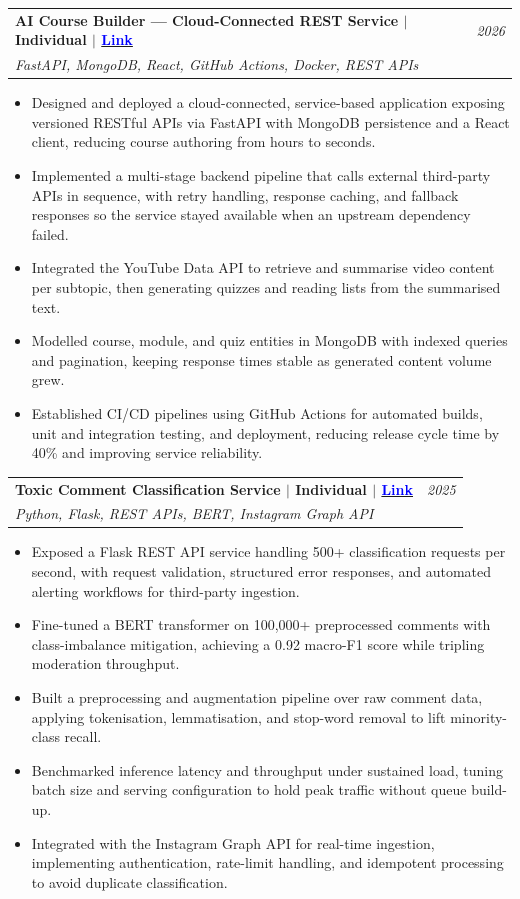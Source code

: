 \documentclass[a4paper,11pt]{article}
\makeatletter
\newcommand{\resumeProject}[4]{
\vspace{0.5mm}\item
    \begin{tabular*}{0.98\textwidth}[t]{l@{\extracolsep{\fill}}r}
        \textbf{#1} & \textit{\footnotesize{#3}} \\
        \footnotesize{\textit{#2}} & \footnotesize{#4}
    \end{tabular*}
    \vspace{-2.4mm}
}
\newcommand{\resumeItemListStart}{\begin{justify}\begin{itemize}[label=$\bullet$, leftmargin=3.4ex, rightmargin=1ex, noitemsep, labelsep=1.4mm, itemsep=0.35mm, topsep=0.6mm]\small}
\newcommand{\resumeItemListEnd}{\end{itemize}\end{justify}\vspace{-2mm}}
\makeatother
\begin{document}
  \resumeProject
    {AI Course Builder --- Cloud-Connected REST Service $\vert$ Individual $\vert$ \href{https://github.com/alexmorgan-dev/ai_course_builder.git}{\textcolor{blue}{Link}}}
    {FastAPI, MongoDB, React, GitHub Actions, Docker, REST APIs}
    {2026}
    {}
  \vspace{-1.0mm}
  \resumeItemListStart
    \justifying
    \item Designed and deployed a cloud-connected, service-based application exposing versioned RESTful APIs via FastAPI with MongoDB persistence and a React client, reducing course authoring from hours to seconds.
    \item Implemented a multi-stage backend pipeline that calls external third-party APIs in sequence, with retry handling, response caching, and fallback responses so the service stayed available when an upstream dependency failed.
    \item Integrated the YouTube Data API to retrieve and summarise video content per subtopic, then generating quizzes and reading lists from the summarised text.
    \item Modelled course, module, and quiz entities in MongoDB with indexed queries and pagination, keeping response times stable as generated content volume grew.
    \item Established CI/CD pipelines using GitHub Actions for automated builds, unit and integration testing, and deployment, reducing release cycle time by 40\% and improving service reliability.
  \resumeItemListEnd
  \vspace{-4mm}

  \resumeProject
    {Toxic Comment Classification Service $\vert$ Individual $\vert$ \href{https://github.com/alexmorgan-dev/toxic_message_classifier.git}{\textcolor{blue}{Link}}}
    {Python, Flask, REST APIs, BERT, Instagram Graph API}
    {2025}
    {}
  \vspace{-1.0mm}
  \resumeItemListStart
    \justifying
    \item Exposed a Flask REST API service handling 500+ classification requests per second, with request validation, structured error responses, and automated alerting workflows for third-party ingestion.
    \item Fine-tuned a BERT transformer on 100,000+ preprocessed comments with class-imbalance mitigation, achieving a 0.92 macro-F1 score while tripling moderation throughput.
    \item Built a preprocessing and augmentation pipeline over raw comment data, applying tokenisation, lemmatisation, and stop-word removal to lift minority-class recall.
    \item Benchmarked inference latency and throughput under sustained load, tuning batch size and serving configuration to hold peak traffic without queue build-up.
    \item Integrated with the Instagram Graph API for real-time ingestion, implementing authentication, rate-limit handling, and idempotent processing to avoid duplicate classification.
  \resumeItemListEnd
  \vspace{-4mm}
\end{document}
